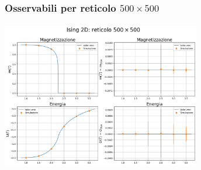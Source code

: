 \begin{frame}
    \frametitle{Osservabili per reticolo $500 \times 500$}
    \framesubtitle{}

    \centering
    \includegraphics[width=0.65\textwidth]{Immagini/backupIsing2D/obs_500.png}

\end{frame}
